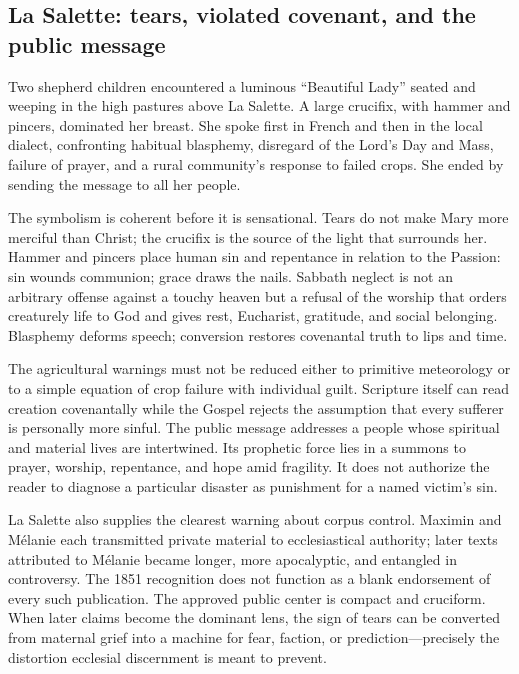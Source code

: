 \subsection{La Salette: tears, violated covenant, and the public message}


Two shepherd children encountered a luminous ``Beautiful Lady'' seated and weeping in the high pastures above La Salette. A large crucifix, with hammer and pincers, dominated her breast. She spoke first in French and then in the local dialect, confronting habitual blasphemy, disregard of the Lord's Day and Mass, failure of prayer, and a rural community's response to failed crops. She ended by sending the message to all her people.

The symbolism is coherent before it is sensational. Tears do not make Mary more merciful than Christ; the crucifix is the source of the light that surrounds her. Hammer and pincers place human sin and repentance in relation to the Passion: sin wounds communion; grace draws the nails. Sabbath neglect is not an arbitrary offense against a touchy heaven but a refusal of the worship that orders creaturely life to God and gives rest, Eucharist, gratitude, and social belonging. Blasphemy deforms speech; conversion restores covenantal truth to lips and time.

The agricultural warnings must not be reduced either to primitive meteorology or to a simple equation of crop failure with individual guilt. Scripture itself can read creation covenantally while the Gospel rejects the assumption that every sufferer is personally more sinful. The public message addresses a people whose spiritual and material lives are intertwined. Its prophetic force lies in a summons to prayer, worship, repentance, and hope amid fragility. It does not authorize the reader to diagnose a particular disaster as punishment for a named victim's sin.

La Salette also supplies the clearest warning about corpus control. Maximin and Mélanie each transmitted private material to ecclesiastical authority; later texts attributed to Mélanie became longer, more apocalyptic, and entangled in controversy. The 1851 recognition does not function as a blank endorsement of every such publication. The approved public center is compact and cruciform. When later claims become the dominant lens, the sign of tears can be converted from maternal grief into a machine for fear, faction, or prediction---precisely the distortion ecclesial discernment is meant to prevent.

